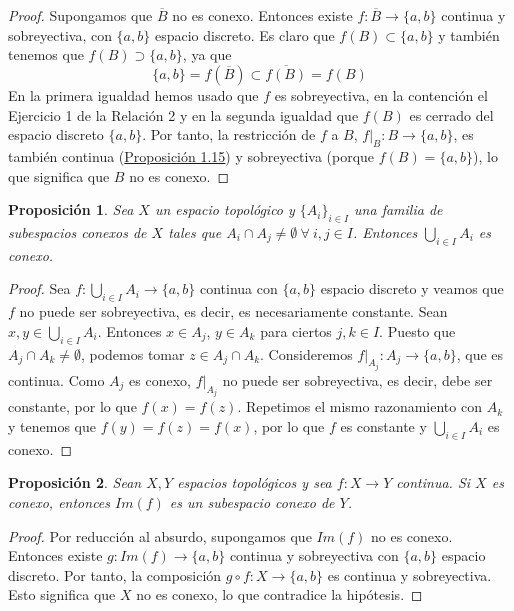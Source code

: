 \documentclass[12pt]{report}
\newtheorem{proposition}{Proposición}[chapter]
\theoremstyle{definition}
\theoremstyle{definition}
\theoremstyle{remark}
\begin{document}
\begin{proof}
Supongamos que $\overline{B}$ no es conexo. Entonces existe $f \colon \overline{B} \to \{a,b\}$ continua y sobreyectiva, con $\{a,b\}$ espacio discreto. Es claro que $f(B) \subset \{a,b\}$ y también tenemos que $f(B) \supset \{a,b\}$, ya que
\[\{a,b\} = f(\overline{B}) \subset \overline{f(B)} = f(B)\]
En la primera igualdad hemos usado que $f$ es sobreyectiva, en la contención el Ejercicio 1 de la Relación 2 y en la segunda igualdad que $f(B)$ es cerrado del espacio discreto $\{a,b\}$. Por tanto, la restricción de $f$ a $B$, $\left.f\right|_B \colon B \to \{a,b\}$, es también continua (\hyperref[prop1.15.]{\color{blue}Proposición 1.15}) y sobreyectiva (porque $f(B) = \{a,b\}$), lo que significa que $B$ no es conexo. 
\end{proof}

\begin{proposition}
Sea $X$ un espacio topológico y $\{A_i\}_{i \in I}$ una familia de subespacios conexos de $X$ tales que $A_i \cap A_j \neq \emptyset \ \forall \ i,j \in I$. Entonces $\bigcup_{i \in I}A_i$ es conexo.
\end{proposition}

\begin{proof}
Sea $f \colon \bigcup_{i \in I}A_i \to \{a,b\}$ continua con $\{a,b\}$ espacio discreto y veamos que $f$ no puede ser sobreyectiva, es decir, es necesariamente constante. Sean $x,y \in \bigcup_{i \in I}A_i$. Entonces $x \in A_j$, $y \in A_k$ para ciertos $j,k \in I$. Puesto que $A_j \cap A_k \neq \emptyset$, podemos tomar $z \in A_j \cap A_k$. Consideremos $\left.f\right|_{A_j} \colon A_j \to \{a,b\}$, que es continua. Como $A_j$ es conexo, $\left.f\right|_{A_j}$ no puede ser sobreyectiva, es decir, debe ser constante, por lo que $f(x) = f(z)$. Repetimos el mismo razonamiento con $A_k$ y tenemos que $f(y) = f(z) = f(x)$, por lo que $f$ es constante y $\bigcup_{i \in I}A_i$ es conexo. 
\end{proof}

\begin{proposition}
Sean $X,Y$ espacios topológicos y sea $f \colon X \to Y$ continua. Si $X$ es conexo, entonces $Im(f)$ es un subespacio conexo de $Y$.
\end{proposition}

\begin{proof}
Por reducción al absurdo, supongamos que $Im(f)$ no es conexo. Entonces existe $g \colon Im(f) \to \{a,b\}$ continua y sobreyectiva con $\{a,b\}$ espacio discreto. Por tanto, la composición $g \circ f \colon X \to \{a,b\}$ es continua y sobreyectiva. Esto significa que $X$ no es conexo, lo que contradice la hipótesis.
\end{proof}
\end{document}
